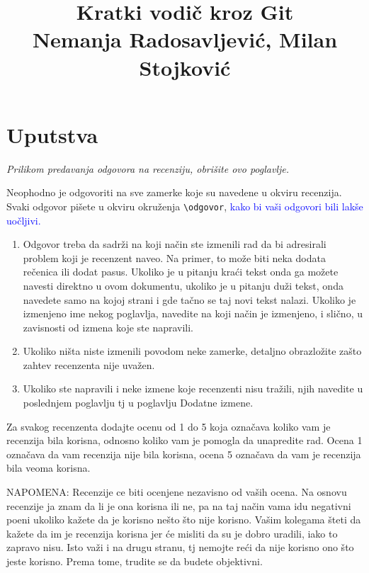 \documentclass[a4paper]{report}
\newcommand{\odgovor}[1]{\textcolor{blue}{#1}}
\begin{document}
\title{Kratki vodič kroz Git\\ \small{Nemanja Radosavljević, Milan Stojković}}

\maketitle
\tableofcontents

\chapter{Uputstva}
\emph{Prilikom predavanja odgovora na recenziju, obrišite ovo poglavlje.}

Neophodno je odgovoriti na sve zamerke koje su navedene u okviru recenzija. Svaki odgovor pišete u okviru okruženja \verb"\odgovor", \odgovor{kako bi vaši odgovori bili lakše uočljivi.} 
\begin{enumerate}

\item Odgovor treba da sadrži na koji način ste izmenili rad da bi adresirali problem koji je recenzent naveo. Na primer, to može biti neka dodata rečenica ili dodat pasus. Ukoliko je u pitanju kraći tekst onda ga možete navesti direktno u ovom dokumentu, ukoliko je u pitanju duži tekst, onda navedete samo na kojoj strani i gde tačno se taj novi tekst nalazi. Ukoliko je izmenjeno ime nekog poglavlja, navedite na koji način je izmenjeno, i slično, u zavisnosti od izmena koje ste napravili. 

\item Ukoliko ništa niste izmenili povodom neke zamerke, detaljno obrazložite zašto zahtev recenzenta nije uvažen.

\item Ukoliko ste napravili i neke izmene koje recenzenti nisu tražili, njih navedite u poslednjem poglavlju tj u poglavlju Dodatne izmene.
\end{enumerate}

Za svakog recenzenta dodajte ocenu od 1 do 5 koja označava koliko vam je recenzija bila korisna, odnosno koliko vam je pomogla da unapredite rad. Ocena 1 označava da vam recenzija nije bila korisna, ocena 5 označava da vam je recenzija bila veoma korisna. 

NAPOMENA: Recenzije ce biti ocenjene nezavisno od vaših ocena. Na osnovu recenzije ja znam da li je ona korisna ili ne, pa na taj način vama idu negativni poeni ukoliko kažete da je korisno nešto što nije korisno. Vašim kolegama šteti da kažete da im je recenzija korisna jer će misliti da su je dobro uradili, iako to zapravo nisu. Isto važi i na drugu stranu, tj nemojte reći da nije korisno ono što jeste korisno. Prema tome, trudite se da budete objektivni. 
\end{document}
